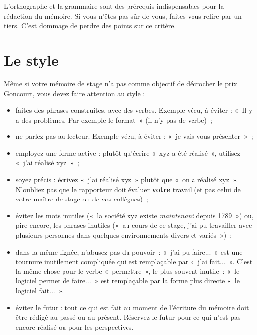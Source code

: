 \documentclass [twoside,openright,a4paper,11pt,french] {report}
\begin{document}
L'orthographe et la grammaire sont des prérequis indispensables pour
la rédaction du mémoire. Si vous n'êtes pas sûr de vous, faites-vous
relire par un tiers. C'est dommage de perdre des points sur ce critère.

\section {Le style}

Même si votre mémoire de stage n'a pas comme objectif de décrocher
le prix Goncourt, vous devez faire attention au style :

\begin {itemize}
    \item faites des phrases construites, avec des verbes. Exemple vécu,
	à éviter : «~Il y a des problèmes. Par exemple le
	format~» (il n'y pas de verbe)~;

    \item ne parlez pas au lecteur. Exemple vécu, à éviter : «~je vais
	vous présenter~»~;

    \item employez une forme active : plutôt qu'écrire «~xyz a été
	réalisé~», utilisez «~j'ai réalisé xyz~»~;

    \item soyez précis : écrivez «~j'ai réalisé xyz~» plutôt que «~on a
	réalisé xyz~». N'oubliez pas que le rapporteur doit évaluer
	\textbf{votre} travail (et pas celui de votre maître de stage ou
	de vos collègues)~;

    \item évitez les mots inutiles («~la société xyz existe
	\emph{maintenant} depuis 1789~») ou, pire encore, les phrases
	inutiles («~au cours de ce stage, j'ai pu travailler avec
	plusieurs personnes dans quelques environnements divers et
	variés~»)~;

    \item dans la même lignée, n'abusez pas du pouvoir~: «~j'ai pu
	faire...~» est une tournure inutilement compliquée qui est
	remplaçable par «~j'ai fait...~». C'est la même chose pour le
	verbe «~permettre~», le plus souvent inutile~: «~le logiciel
	permet de faire...~» est remplaçable par la forme plus directe
	«~le logiciel fait...~».

    \item évitez le futur : tout ce qui est fait au moment de l'écriture
	du mémoire doit être rédigé au passé ou au
	présent. Réservez le futur pour ce qui n'est pas encore
	réalisé ou pour les perspectives.

\end {itemize}
\end{document}
